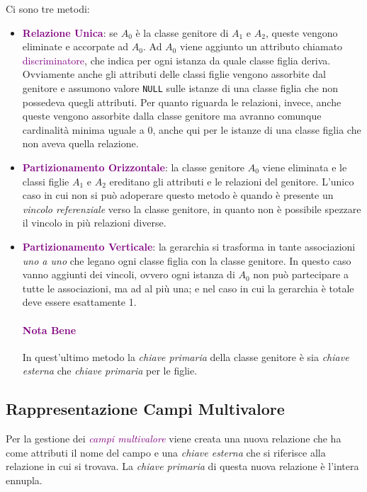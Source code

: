 Ci sono tre metodi:
\begin{itemize}
    \item \textbf{\textcolor{purple}{Relazione Unica}}: se $A_0$ è la classe genitore di $A_1$ e $A_2$, queste vengono
        eliminate e accorpate ad $A_0$. Ad $A_0$ viene aggiunto un attributo chiamato \textcolor{purple}{discriminatore},
        che indica per ogni istanza da quale classe figlia deriva. Ovviamente anche gli attributi delle classi figlie
        vengono assorbite dal genitore e assumono valore \verb|NULL| sulle istanze di una classe figlia che non possedeva quegli
        attributi. Per quanto riguarda le relazioni, invece, anche queste vengono assorbite dalla classe genitore ma avranno
        comunque cardinalità minima uguale a 0, anche qui per le istanze di una classe figlia che non aveva quella relazione.
    \item \textbf{\textcolor{purple}{Partizionamento Orizzontale}}: la classe genitore $A_0$ viene eliminata e le classi figlie $A_1$
        e $A_2$ ereditano gli attributi e le relazioni del genitore. L'unico caso in cui non si può adoperare questo metodo è quando
        è presente un \emph{vincolo referenziale} verso la classe genitore, in quanto non è possibile spezzare il vincolo
        in più relazioni diverse.
    \item \textbf{\textcolor{purple}{Partizionamento Verticale}}: la gerarchia si trasforma in tante associazioni \emph{uno a uno}
        che legano ogni classe figlia con la classe genitore. In questo caso vanno aggiunti dei vincoli, ovvero ogni istanza di
        $A_0$ non può partecipare a tutte le associazioni, ma ad al più una; e nel caso in cui la gerarchia
        è totale deve essere esattamente 1.
        \paragraph{\textcolor{purple}{Nota Bene}} In quest'ultimo metodo la \emph{chiave primaria} della classe genitore
        è sia \emph{chiave esterna} che \emph{chiave primaria} per le figlie.
\end{itemize}

\subsection{Rappresentazione Campi Multivalore}
Per la gestione dei \emph{\textcolor{purple}{campi multivalore}} viene creata una nuova relazione
che ha come attributi il nome del campo e una \emph{chiave esterna} che si riferisce alla relazione in cui si
trovava. La \emph{chiave primaria} di questa nuova relazione è l'intera ennupla.